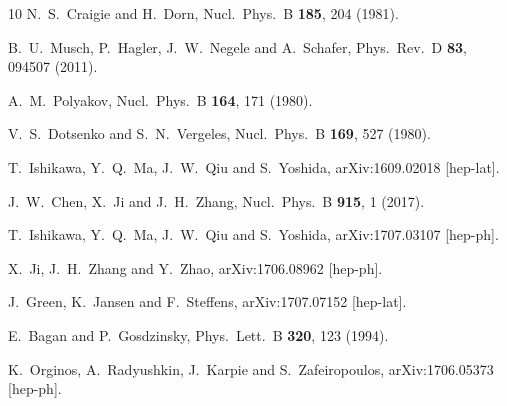 \begin{thebibliography}{10}
N.~S.~Craigie and H.~Dorn,
Nucl.\ Phys.\ B {\bf 185}, 204 (1981).

B.~U.~Musch, P.~Hagler, J.~W.~Negele and A.~Schafer,
Phys.\ Rev.\ D {\bf 83}, 094507 (2011).

A.~M.~Polyakov,
Nucl.\ Phys.\ B {\bf 164}, 171 (1980).

V.~S.~Dotsenko and S.~N.~Vergeles,
Nucl.\ Phys.\ B {\bf 169}, 527 (1980).

T.~Ishikawa, Y.~Q.~Ma, J.~W.~Qiu and S.~Yoshida,
arXiv:1609.02018 [hep-lat].

J.~W.~Chen, X.~Ji and J.~H.~Zhang,
Nucl.\ Phys.\ B {\bf 915}, 1 (2017).

T.~Ishikawa, Y.~Q.~Ma, J.~W.~Qiu and S.~Yoshida,
arXiv:1707.03107 [hep-ph].

X.~Ji, J.~H.~Zhang and Y.~Zhao,
arXiv:1706.08962 [hep-ph].

J.~Green, K.~Jansen and F.~Steffens,
arXiv:1707.07152 [hep-lat].

E.~Bagan and P.~Gosdzinsky,
Phys.\ Lett.\ B {\bf 320}, 123 (1994).

K.~Orginos, A.~Radyushkin, J.~Karpie and S.~Zafeiropoulos,
arXiv:1706.05373 [hep-ph].

\end{thebibliography}

